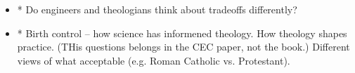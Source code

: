 \begin{itemize}
\item* Do engineers and theologians think about tradeoffs differently?
\item* Birth control -- how science has informened theology. 
How theology shapes practice.
(THis questions belongs in the CEC paper, not the book.)
Different views of what acceptable (e.g. Roman Catholic vs. Protestant).




\end{itemize}